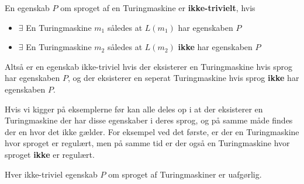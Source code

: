 \begin{definition}
	En egenskab $P$ om sproget af en Turingmaskine er \textbf{ikke-trivielt}, hvis
	\begin{itemize}


		\item $\exists$ En Turingmaskine $m_{1}$ således at $L(m_{1})$ har egenskaben $P$
		\item $\exists$ En Turingmaskine $m_{2}$ således at $L(m_{2})$ \textbf{ikke} har egenskaben $P$
	\end{itemize}

\end{definition}

Altså er en egenskab ikke-triviel hvis der eksisterer en Turingmaskine hvis sprog har egenskaben $P$, og der eksisterer en seperat Turingmaskine hvis sprog \textbf{ikke} har egenskaben $P$.

Hvis vi kigger på eksemplerne før kan alle deles op i at der eksisterer en Turingmaskine der har disse egenskaber i deres sprog, og på samme måde findes der en hvor det ikke gælder. For eksempel ved det første, er der en Turingmaskine hvor sproget er regulært, men på samme tid er der også en Turingmaskine hvor sproget \textbf{ikke} er regulært.

\begin{theorem}
	Hver ikke-triviel egenskab $P$ om sproget af Turingmaskiner er uafgørlig.
\end{theorem}

